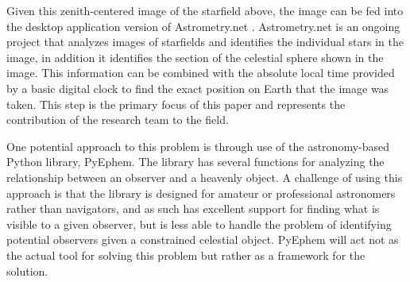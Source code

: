 \documentclass[]{article}
\begin{document}
    Given this zenith-centered image of the starfield above, the image can be fed into the desktop application version of Astrometry.net \cite{tag11}. Astrometry.net is an ongoing project that analyzes images of starfields and identifies the individual stars in the image, in addition it identifies the section of the celestial sphere shown in the image. This information can be combined with the absolute local time provided by a basic digital clock to find the exact position on Earth that the image was taken. This step is the primary focus of this paper and represents the contribution of the research team to the field. \newline
    
    One potential approach to this problem is through use of the astronomy-based Python library, PyEphem. The library has several functions for analyzing the relationship between an observer and a heavenly object. A challenge of using this approach is that the library is designed for amateur or professional astronomers rather than navigators, and as such has excellent support for finding what is visible to a given observer, but is less able to handle the problem of identifying potential observers given a constrained celestial object. PyEphem will act not as the actual tool for solving this problem but rather as a framework for the solution.\newline

\newpage
{}
\end{document}
